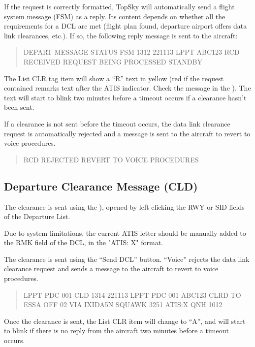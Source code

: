 \documentclass[11pt,a4paper]{memoir}
\newenvironment{Note}
  {\begin{shaded}\marginnote{\fbox{Note}}}
  {\end{shaded}}
\begin{document}
If the request is correctly formatted, TopSky will automatically send a flight system message (FSM) as a reply. Its content depends on whether all the requirements for a DCL are met (flight plan found, departure airport offers data link clearances, etc.). If so, the following reply message is sent to the aircraft:

\begin{quote}
  DEPART MESSAGE STATUS FSM 1312 221113 LPPT ABC123 RCD RECEIVED REQUEST BEING PROCESSED STANDBY 
\end{quote}

The List CLR tag item will show a “R” text in yellow (red if the request contained remarks text after the ATIS indicator. Check the message in the \textit{}). The text will start to blink two minutes before a timeout occurs if a clearance hasn’t been sent.

If a clearance is not sent before the timeout occurs, the data link clearance request is automatically rejected and a message is sent to the aircraft to revert to voice procedures.

\begin{quote}
  RCD REJECTED REVERT TO VOICE PROCEDURES
\end{quote}

\subsection*{Departure Clearance Message (CLD)}

The clearance is sent using the \textit{}), opened by left clicking the RWY or SID fields of the Departure List. 

\begin{Note}
  Due to system limitations, the current ATIS letter should be manually added to the RMK field of the DCL, in the "ATIS: X" format.
\end{Note}

The clearance is sent using the “Send DCL” button. “Voice” rejects the data link clearance request and sends a message to the aircraft to revert to voice procedures. 

\begin{quote}
  LPPT PDC 001 CLD 1314 221113 LPPT PDC 001 ABC123 CLRD TO ESSA OFF 02 VIA IXIDA5N SQUAWK 3251 ATIS:X QNH 1012
\end{quote}

Once the clearance is sent, the List CLR item will change to “A”, and will start to blink if there is no reply from the aircraft two minutes before a timeout occurs.
\end{document}
